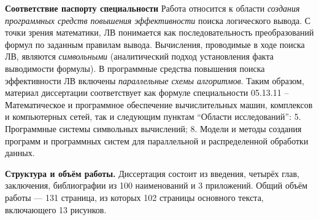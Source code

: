 \documentclass[a4paper]{report}
\begin{document}



\textbf{Соответствие паспорту специальности}
Работа относится к области \emph{создания программных средств повышения эффективности} поиска логического вывода. С точки зрения математики, ЛВ понимается как последовательность преобразований формул по заданным правилам вывода. Вычисления, проводимые в ходе поиска ЛВ, являются \emph{символьными} (аналитический подход установления факта выводимости формулы). В программные средства повышения поиска эффективности ЛВ включены \emph{параллельные схемы алгоритмов}. Таким образом, материал диссертации соответствует как формуле специальности 05.13.11 -- Математическое и программное обеспечение вычислительных машин, комплексов и компьютерных сетей, так и следующим пунктам ``Области исследований'': 5. Программные системы символьных вычислений; 8. Модели и методы создания программ и программных систем для параллельной и распределенной обработки данных.

\textbf{Структура и объём работы.} Диссертация состоит из введения, четырёх глав, заключения, библиографии из 100 наименований и 3 приложений. Общий объём работы --- 131 страница, из которых 102 страницы основного текста, включающего 13 рисунков.
\end{document}
